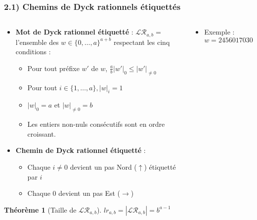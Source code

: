 \documentclass{beamer}
\newtheorem*{thm}{Théorème}
\begin{document}
\begin{frame} %
    \fontsize{9}{11}
    \frametitle{2.1) Chemins de Dyck rationnels étiquettés}
    \begin{columns}
        \begin{column}{0.7\textwidth}
            \begin{itemize}
                \item \textbf{Mot de Dyck rationnel étiquetté} : 
                    $\mathcal{LR}_{a,b} =$ l'ensemble des $w \in
                    \{0,\ldots, a\}^{a+b}$ respectant les cinq conditions :
                \begin{itemize}
                    \item Pour tout préfixe $w'$ de $w$, $\frac{a}{b}|w'|_0
                        \leqslant |w'|_{\neq 0}$
                    \item Pour tout $i \in \{1, \ldots, a\}, |w|_i = 1$
                    \item $|w|_0 = a$ et $|w|_{\neq 0} = b$
                    \item Les entiers non-nuls consécutifs sont en ordre
                        croissant.
                \end{itemize}
                \item \textbf{Chemin de Dyck rationnel étiquetté} :
                \begin{itemize}
                    \item Chaque $i \neq 0$ devient un pas Nord ($\uparrow$)
                        étiquetté par $i$
                    \item Chaque 0 devient un pas Est ($\rightarrow$)
                \end{itemize}
            \end{itemize}

            \begin{thm} [Taille de $\mathcal{LR}_{a,b}$]
                $\displaystyle lr_{a,b} = |\mathcal{LR}_{a,b}| = b^{a-1}$
            \end{thm}

        \end{column}
        \begin{column}{0.3\textwidth} 
                \begin{itemize}
                    \item Exemple : $w = 2456017030 \in \mathcal{LR}_{7,3}$
                \end{itemize}
                
        \end{column}
    \end{columns}
\end{frame}
\end{document}

